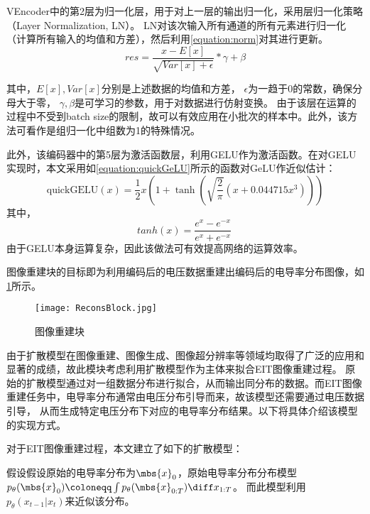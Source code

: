 VEncoder中的第2层为归一化层，用于对上一层的输出归一化，采用层归一化策略（Layer Normalization, LN）。
LN对该次输入所有通道的所有元素进行归一化（计算所有输入的均值和方差），然后利用\cref{equation:norm}对其进行更新。
\begin{equation}
  \label{equation:norm}
  res = \frac{x - E\left[ x\right]}{\sqrt{Var\left[ x\right] + \epsilon}} * \gamma + \beta
\end{equation}

其中，$E\left[ x\right], Var\left[ x\right]$分别是上述数据的均值和方差， $\epsilon$为一趋于0的常数，确保分母大于零，
$\gamma, \beta$是可学习的参数，用于对数据进行仿射变换。
由于该层在运算的过程中不受到batch size的限制，故可以有效应用在小批次的样本中。此外，该方法可看作是组归一化中组数为1的特殊情况。


此外，该编码器中的第5层为激活函数层，利用GELU作为激活函数。在对GELU实现时，本文采用如\cref{equation:quickGeLU}所示的函数对GeLU作近似估计：
  \begin{equation}
    \label{equation:quickGeLU}
    \text{quickGELU}(x) = \frac{1}{2}x\left(1 + \tanh\left(\sqrt{\frac{2}{\pi}}\left(x + 0.044715x^3\right)\right)\right)
  \end{equation}
  其中，
  \begin{equation}
    tanh(x) = \frac{{e^{x} - e^{-x}}}{{e^{x} + e^{-x}}}
\
  \end{equation}
由于GELU本身运算复杂，因此该做法可有效提高网络的运算效率。







图像重建块的目标即为利用编码后的电压数据重建出编码后的电导率分布图像，如\cref{figure:ReconsBlock}所示。
\begin{figure}[h]
    \centering
    \texttt{[image: ReconsBlock.jpg]}
    \caption{图像重建块}
    \label{figure:ReconsBlock}
\end{figure}

由于扩散模型在图像重建、图像生成、图像超分辨率等领域均取得了广泛的应用和显著的成绩，故此模块考虑利用扩散模型作为主体来拟合EIT图像重建过程。
原始的扩散模型通过对一组数据分布进行拟合，从而输出同分布的数据。而EIT图像重建任务中，电导率分布通常由电压分布引导而来，故该模型还需要通过电压数据引导，
从而生成特定电压分布下对应的电导率分布结果。以下将具体介绍该模型的实现方式。

对于EIT图像重建过程，本文建立了如下的扩散模型：

假设假设原始的电导率分布为$\mbs{x}_0$，原始电导率分布分布模型$p_\theta(\mbs{x}_0) \coloneqq \int p_\theta(\mbs{x}_{0:T})\diff x_{1:T}$。
而此模型利用$p_\theta(x_{t-1}|x_{t})$来近似该分布。

